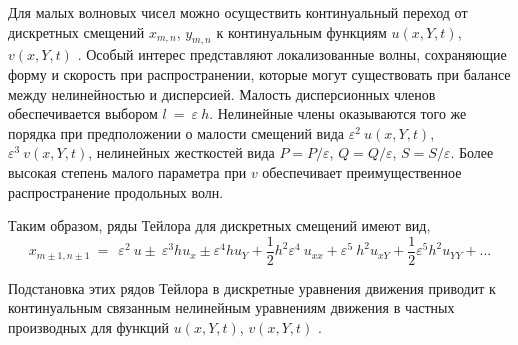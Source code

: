 Для малых волновых чисел можно осуществить континуальный переход от дискретных смещений $x_{m, n} $, $y_{m, n}$ к континуальным функциям $u(x, Y, t) $, $v(x, Y, t)$ \cite{porkros}. Особый интерес представляют локализованные волны, сохраняющие форму и скорость при распространении, которые могут существовать при балансе между нелинейностью и дисперсией. Малость дисперсионных членов обеспечивается выбором $l ~ = ~ \varepsilon ~ h$. Нелинейные члены оказываются того же порядка при предположении о малости смещений вида $\varepsilon^2 ~ u (x, Y, t) $, $\varepsilon ^ 3 ~ v (x, Y, t)$, нелинейных жесткостей вида $P = P / \varepsilon $, $ Q = Q / \varepsilon$, $ S = S / \varepsilon $. Более высокая степень малого параметра при $v$ обеспечивает преимущественное распространение продольных волн.

Таким образом, ряды Тейлора для дискретных смещений имеют вид,
\[
x_{m\pm1,n\pm1}~=~ ~\varepsilon^2~u\pm~\varepsilon^3 h u_x\pm \varepsilon^4 h u_Y+\frac{1}{2} h^2 \varepsilon^4~u_{xx}+ \varepsilon^5~ h^2 u_{xY}+\frac{1}{2}\varepsilon^5 h^2 u_{YY}+...
\]

Подстановка этих рядов Тейлора в дискретные уравнения движения приводит к континуальным связанным нелинейным уравнениям движения в частных производных для функций $u(x, Y, t)$, $v(x, Y, t)$ \cite{porkros}. 
%

